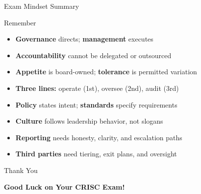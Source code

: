 \documentclass{beamer}
\begin{document}
	\begin{frame}{Exam Mindset Summary}
		\begin{block}{Remember}
			\begin{itemize}
				\item \textbf{Governance} directs; \textbf{management} executes
				\item \textbf{Accountability} cannot be delegated or outsourced
				\item \textbf{Appetite} is board-owned; \textbf{tolerance} is permitted variation
				\item \textbf{Three lines:} operate (1st), oversee (2nd), audit (3rd)
				\item \textbf{Policy} states intent; \textbf{standards} specify requirements
				\item \textbf{Culture} follows leadership behavior, not slogans
				\item \textbf{Reporting} needs honesty, clarity, and escalation paths
				\item \textbf{Third parties} need tiering, exit plans, and oversight
			\end{itemize}
		\end{block}
	\end{frame}
	
	\begin{frame}{Thank You}
		\begin{center}
			{\Huge \textbf{Good Luck on Your CRISC Exam!}}
		\end{center}
	\end{frame}
	
\end{document}
